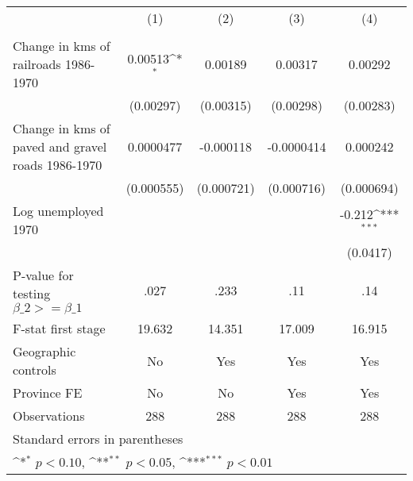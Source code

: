{
\def\sym#1{\ifmmode^{#1}\else\(^{#1}\)\fi}
\begin{tabular}{l*{4}{c}}
\hline\hline
                &\multicolumn{1}{c}{(1)}&\multicolumn{1}{c}{(2)}&\multicolumn{1}{c}{(3)}&\multicolumn{1}{c}{(4)}\\
                &\multicolumn{1}{c}{}&\multicolumn{1}{c}{}&\multicolumn{1}{c}{}&\multicolumn{1}{c}{}\\
\hline
Change in kms of railroads 1986-1970&  0.00513\sym{*}  &  0.00189         &  0.00317         &  0.00292         \\
                &(0.00297)         &(0.00315)         &(0.00298)         &(0.00283)         \\
[1em]
Change in kms of paved and gravel roads 1986-1970&0.0000477         &-0.000118         &-0.0000414         & 0.000242         \\
                &(0.000555)         &(0.000721)         &(0.000716)         &(0.000694)         \\
[1em]
Log unemployed 1970&                  &                  &                  &   -0.212\sym{***}\\
                &                  &                  &                  & (0.0417)         \\
\hline
P-value for testing $\beta\_{2} >= \beta\_{1}$&     .027         &     .233         &      .11         &      .14         \\
F-stat first stage&   19.632         &   14.351         &   17.009         &   16.915         \\
Geographic controls&       No         &      Yes         &      Yes         &      Yes         \\
Province FE     &       No         &       No         &      Yes         &      Yes         \\
Observations    &      288         &      288         &      288         &      288         \\
\hline\hline
\multicolumn{5}{l}{\footnotesize Standard errors in parentheses}\\
\multicolumn{5}{l}{\footnotesize \sym{*} \(p<0.10\), \sym{**} \(p<0.05\), \sym{***} \(p<0.01\)}\\
\end{tabular}
}
